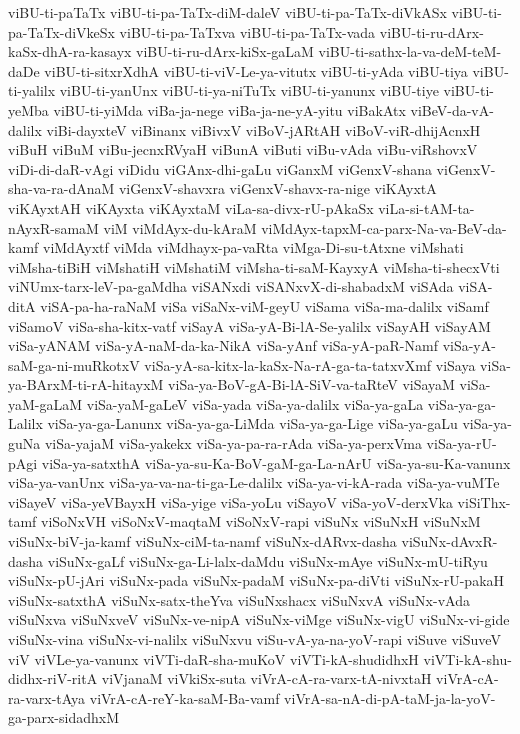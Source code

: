 {viBU-ti-paTaTx
viBU-ti-pa-TaTx-diM-daleV
viBU-ti-pa-TaTx-diVkASx
viBU-ti-pa-TaTx-diVkeSx
viBU-ti-pa-TaTxva
viBU-ti-pa-TaTx-vada
viBU-ti-ru-dArx-kaSx-dhA-ra-kasayx
viBU-ti-ru-dArx-kiSx-gaLaM
viBU-ti-sathx-la-va-deM-teM-daDe
viBU-ti-sitxrXdhA
viBU-ti-viV-Le-ya-vitutx
viBU-ti-yAda
viBU-tiya
viBU-ti-yalilx
viBU-ti-yanUnx
viBU-ti-ya-niTuTx
viBU-ti-yanunx
viBU-tiye
viBU-ti-yeMba
viBU-ti-yiMda
viBa-ja-nege
viBa-ja-ne-yA-yitu
viBakAtx
viBeV-da-vA-dalilx
viBi-dayxteV
viBinanx
viBivxV
viBoV-jARtAH
viBoV-viR-dhijAcnxH
viBuH
viBuM
viBu-jecnxRVyaH
viBunA
viButi
viBu-vAda
viBu-viRshovxV
viDi-di-daR-vAgi
viDidu
viGAnx-dhi-gaLu
viGanxM
viGenxV-shana
viGenxV-sha-va-ra-dAnaM
viGenxV-shavxra
viGenxV-shavx-ra-nige
viKAyxtA
viKAyxtAH
viKAyxta
viKAyxtaM
viLa-sa-divx-rU-pAkaSx
viLa-si-tAM-ta-nAyxR-samaM
viM
viMdAyx-du-kAraM
viMdAyx-tapxM-ca-parx-Na-va-BeV-da-kamf
viMdAyxtf
viMda
viMdhayx-pa-vaRta
viMga-Di-su-tAtxne
viMshati
viMsha-tiBiH
viMshatiH
viMshatiM
viMsha-ti-saM-KayxyA
viMsha-ti-shecxVti
viNUmx-tarx-leV-pa-gaMdha
viSANxdi
viSANxvX-di-shabadxM
viSAda
viSA-ditA
viSA-pa-ha-raNaM
viSa
viSaNx-viM-geyU
viSama
viSa-ma-dalilx
viSamf
viSamoV
viSa-sha-kitx-vatf
viSayA
viSa-yA-Bi-lA-Se-yalilx
viSayAH
viSayAM
viSa-yANAM
viSa-yA-naM-da-ka-NikA
viSa-yAnf
viSa-yA-paR-Namf
viSa-yA-saM-ga-ni-muRkotxV
viSa-yA-sa-kitx-la-kaSx-Na-rA-ga-ta-tatxvXmf
viSaya
viSa-ya-BArxM-ti-rA-hitayxM
viSa-ya-BoV-gA-Bi-lA-SiV-va-taRteV
viSayaM
viSa-yaM-gaLaM
viSa-yaM-gaLeV
viSa-yada
viSa-ya-dalilx
viSa-ya-gaLa
viSa-ya-ga-Lalilx
viSa-ya-ga-Lanunx
viSa-ya-ga-LiMda
viSa-ya-ga-Lige
viSa-ya-gaLu
viSa-ya-guNa
viSa-yajaM
viSa-yakekx
viSa-ya-pa-ra-rAda
viSa-ya-perxVma
viSa-ya-rU-pAgi
viSa-ya-satxthA
viSa-ya-su-Ka-BoV-gaM-ga-La-nArU
viSa-ya-su-Ka-vanunx
viSa-ya-vanUnx
viSa-ya-va-na-ti-ga-Le-dalilx
viSa-ya-vi-kA-rada
viSa-ya-vuMTe
viSayeV
viSa-yeVBayxH
viSa-yige
viSa-yoLu
viSayoV
viSa-yoV-derxVka
viSiThx-tamf
viSoNxVH
viSoNxV-maqtaM
viSoNxV-rapi
viSuNx
viSuNxH
viSuNxM
viSuNx-biV-ja-kamf
viSuNx-ciM-ta-namf
viSuNx-dARvx-dasha
viSuNx-dAvxR-dasha
viSuNx-gaLf
viSuNx-ga-Li-lalx-daMdu
viSuNx-mAye
viSuNx-mU-tiRyu
viSuNx-pU-jAri
viSuNx-pada
viSuNx-padaM
viSuNx-pa-diVti
viSuNx-rU-pakaH
viSuNx-satxthA
viSuNx-satx-theYva
viSuNxshacx
viSuNxvA
viSuNx-vAda
viSuNxva
viSuNxveV
viSuNx-ve-nipA
viSuNx-viMge
viSuNx-vigU
viSuNx-vi-gide
viSuNx-vina
viSuNx-vi-nalilx
viSuNxvu
viSu-vA-ya-na-yoV-rapi
viSuve
viSuveV
viV
viVLe-ya-vanunx
viVTi-daR-sha-muKoV
viVTi-kA-shudidhxH
viVTi-kA-shu-didhx-riV-ritA
viVjanaM
viVkiSx-suta
viVrA-cA-ra-varx-tA-nivxtaH
viVrA-cA-ra-varx-tAya
viVrA-cA-reY-ka-saM-Ba-vamf
viVrA-sa-nA-di-pA-taM-ja-la-yoV-ga-parx-sidadhxM
}
